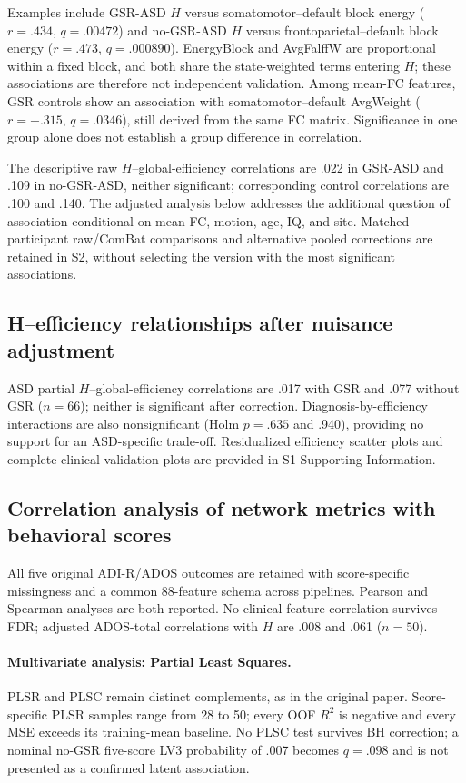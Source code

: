 \documentclass[10pt,letterpaper]{article}
\begin{document}
Examples include GSR-ASD $H$ versus somatomotor--default block energy
($r=.434$, $q=.00472$) and no-GSR-ASD $H$ versus frontoparietal--default block
energy ($r=.473$, $q=.000890$). EnergyBlock and AvgFalffW are proportional within
a fixed block, and both share the state-weighted terms entering $H$; these
associations are therefore not independent validation. Among mean-FC features,
GSR controls show an association with somatomotor--default AvgWeight
($r=-.315$, $q=.0346$), still derived from the same FC matrix. Significance in
one group alone does not establish a group difference in correlation.

The descriptive raw $H$--global-efficiency correlations are .022 in GSR-ASD and
.109 in no-GSR-ASD, neither significant; corresponding control correlations are
.100 and .140. The adjusted analysis below addresses the additional question of
association conditional on mean FC, motion, age, IQ, and site. Matched-participant
raw/ComBat comparisons and alternative pooled corrections are retained in S2,
without selecting the version with the most significant associations.



\subsection*{H--efficiency relationships after nuisance adjustment}

ASD partial $H$--global-efficiency correlations are .017 with GSR and .077 without
GSR ($n=66$); neither is significant after correction. Diagnosis-by-efficiency
interactions are also nonsignificant (Holm $p=.635$ and .940), providing no
support for an ASD-specific trade-off. Residualized efficiency scatter plots and
complete clinical validation plots are provided in S1 Supporting Information.

\subsection*{Correlation analysis of network metrics with behavioral scores}
All five original ADI-R/ADOS outcomes are retained with score-specific missingness
and a common 88-feature schema across pipelines. Pearson and Spearman analyses
are both reported. No clinical feature correlation survives
FDR; adjusted ADOS-total correlations with $H$ are .008 and .061 ($n=50$).

\paragraph*{Multivariate analysis: Partial Least Squares.}
PLSR and PLSC remain distinct complements, as in the original paper.
Score-specific PLSR samples range from 28 to 50; every OOF $R^2$ is negative and
every MSE exceeds its training-mean baseline. No PLSC test survives BH correction;
a nominal no-GSR five-score LV3 probability of .007 becomes $q=.098$ and is not
presented as a confirmed latent association.
\end{document}
